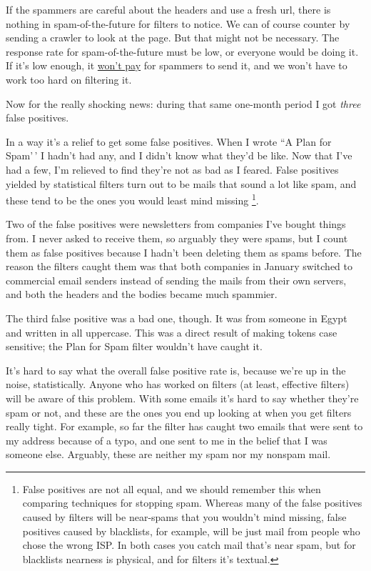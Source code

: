 \documentclass[12pt]{book}
\begin{document}
If the spammers are careful about the headers and use a fresh url, there
is nothing in spam-of-the-future for filters to notice. We can of course
counter by sending a crawler to look at the page. But that might not be
necessary. The response rate for spam-of-the-future must be low, or
everyone would be doing it. If it's low enough, it
\href{wfks.html}{won't pay} for spammers to send it, and we won't have
to work too hard on filtering it.

Now for the really shocking news: during that same one-month period I
got \emph{three} false positives.

In a way it's a relief to get some false positives. When I wrote ``A
Plan for Spam'\,' I hadn't had any, and I didn't know what they'd be
like. Now that I've had a few, I'm relieved to find they're not as bad
as I feared. False positives yielded by statistical filters turn out to
be mails that sound a lot like spam, and these tend to be the ones you
would least mind missing \footnote{False positives are not all equal, and we should remember this
when comparing techniques for stopping spam. Whereas many of the false
positives caused by filters will be near-spams that you wouldn't mind
missing, false positives caused by blacklists, for example, will be just
mail from people who chose the wrong ISP. In both cases you catch mail
that's near spam, but for blacklists nearness is physical, and for
filters it's textual.}.

Two of the false positives were newsletters from companies I've bought
things from. I never asked to receive them, so arguably they were spams,
but I count them as false positives because I hadn't been deleting them
as spams before. The reason the filters caught them was that both
companies in January switched to commercial email senders instead of
sending the mails from their own servers, and both the headers and the
bodies became much spammier.

The third false positive was a bad one, though. It was from someone in
Egypt and written in all uppercase. This was a direct result of making
tokens case sensitive; the Plan for Spam filter wouldn't have caught it.

It's hard to say what the overall false positive rate is, because we're
up in the noise, statistically. Anyone who has worked on filters (at
least, effective filters) will be aware of this problem. With some
emails it's hard to say whether they're spam or not, and these are the
ones you end up looking at when you get filters really tight. For
example, so far the filter has caught two emails that were sent to my
address because of a typo, and one sent to me in the belief that I was
someone else. Arguably, these are neither my spam nor my nonspam mail.
\end{document}
